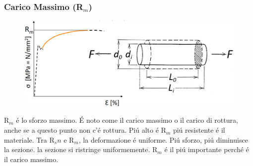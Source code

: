 \documentclass{article}
\begin{document}
{            \subsubsection{Carico Massimo (R$_m$)}
                 \begin{figure}[!h]
                    \centering
                    \includegraphics[width=.85\linewidth]{Carico Unitario Massimo.png}
                \end{figure}
                 R$_m$ \'e lo sforzo massimo. \'E noto come il carico massimo o il carico di rottura, anche se a questo punto non c'\'e rottura. Pi\'u alto \'e R$_m$ pi\'u resistente \'e il materiale.
                 Tra R$_sn$ e R$_m$, la deformazione \'e uniforme. Pi\'u sforzo, pi\'u diminuisce la sezione. la sezione si ristringe uniformemente. R$_m$ \'e il pi\'u importante perch\'e \'e il carico massimo.
}
\end{document}

